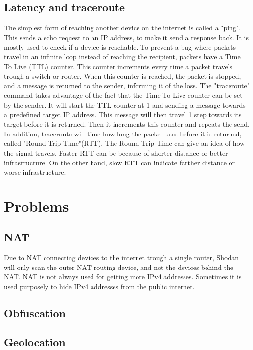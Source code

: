 \subsection{Latency and traceroute}
The simplest form of reaching another device on the internet is called a "ping". This sends a echo request to an IP address, to make it send a response back. It is mostly used to check if a device is reachable. To prevent a bug where packets travel in an infinite loop instead of reaching the recipient, packets have a Time To Live (TTL) counter. This counter increments every time a packet travels trough a switch or router. When this counter is reached, the packet is stopped, and a message is returned to the sender, informing it of the loss.
The "traceroute" command takes advantage of the fact that the Time To Live counter can be set by the sender. It will start the TTL counter at 1 and sending a message towards a predefined target IP address. This message will then travel 1 step towards its target before it is returned. Then it increments this counter and repeats the send. In addition, traceroute will time how long the packet uses before it is returned, called "Round Trip Time"(RTT).
The Round Trip Time can give an idea of how the signal travels. Faster RTT can be because of shorter distance or better infrastructure. On the other hand, slow RTT can indicate farther distance or worse infrastructure.

\section{Problems}
\subsection{NAT}
Due to NAT connecting devices to the internet trough a single router, Shodan will only scan the outer NAT routing device, and not the devices behind the NAT. NAT is not always used for getting more IPv4 addresses. Sometimes it is used purposely to hide IPv4 addresses from the public internet.

\subsection{Obfuscation}


\subsection{Geolocation}
